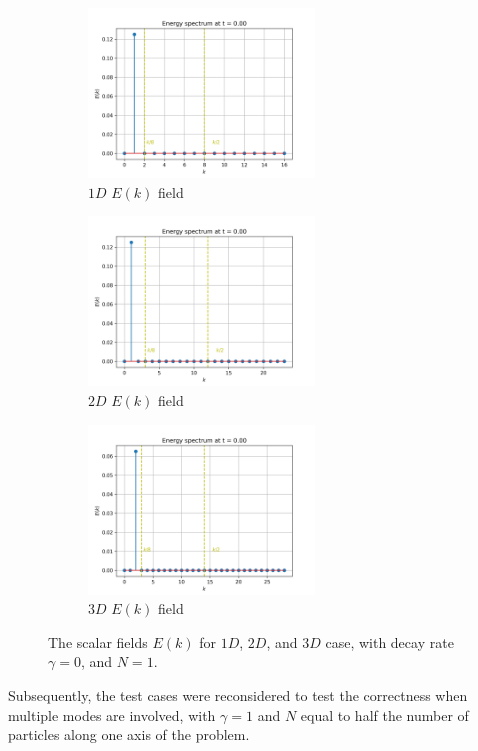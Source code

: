 \begin{figure}[htbp!]
    \begin{subfigure}{7cm}
      \centering\includegraphics[width=6cm]{Code-Figures/espec-simple-1d/energy_spectrum.png}
      \caption{$1D$ $E(k)$ field}
    \end{subfigure}
    \begin{subfigure}{7cm}
      \centering\includegraphics[width=6cm]{Code-Figures/espec-simple-2d/energy_spectrum.png}
      \caption{$2D$ $E(k)$ field}
    \end{subfigure}
    \begin{subfigure}{7cm}
        \centering\includegraphics[width=6cm]{Code-Figures/espec-simple-3d/energy_spectrum.png}
        \caption{$3D$ $E(k)$ field}
      \end{subfigure}
    \caption{The scalar fields $E(k)$ for $1D$, $2D$, and $3D$ case, with decay rate $\gamma=0$, and $N=1$.}
    \label{fig:espec-scalar-fields-N1}
\end{figure}

Subsequently, the test cases were reconsidered to test the correctness when multiple modes are involved, with $\gamma=1$ and $N$ equal to half the number of particles along one axis of the problem.

